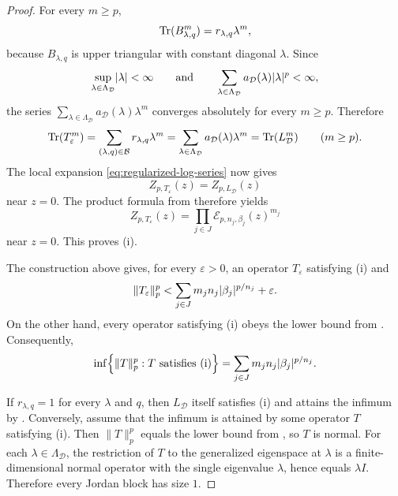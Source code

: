 \begin{proof}
  For every \(m\ge p\),
  \[
    \operatorname{Tr}(B_{\lambda,q}^m)=r_{\lambda,q}\lambda^m,
  \]
  because \(B_{\lambda,q}\) is upper triangular with constant diagonal
  \(\lambda\). Since
  \[
    \sup_{\lambda\in\Lambda_{\mathcal D}}\lvert \lambda \rvert<\infty
    \qquad\text{and}\qquad
    \sum_{\lambda\in\Lambda_{\mathcal D}}
      a_{\mathcal D}(\lambda)\lvert \lambda \rvert^p<\infty,
  \]
  the series
  \(
    \sum_{\lambda\in\Lambda_{\mathcal D}}a_{\mathcal D}(\lambda)\lambda^m
  \)
  converges absolutely for every \(m\ge p\). Therefore
  \[
    \operatorname{Tr}(T_\varepsilon^m)
    =\sum_{(\lambda,q)\in\mathcal B}r_{\lambda,q}\lambda^m
    =\sum_{\lambda\in\Lambda_{\mathcal D}}
      a_{\mathcal D}(\lambda)\lambda^m
    =\operatorname{Tr}(L_{\mathcal D}^m)
    \qquad (m\ge p).
  \]
  The local expansion \eqref{eq:regularized-log-series} now gives
  \[
    Z_{p,T_\varepsilon}(z)
    =Z_{p,L_{\mathcal D}}(z)
  \]
  near \(z=0\). The product formula from
   therefore yields
  \[
    Z_{p,T_\varepsilon}(z)
    =\prod_{j\in J}\mathcal E_{p,n_j,\beta_j}(z)^{m_j}
  \]
  near \(z=0\). This proves \textup{(i)}.

  The construction above gives, for every \(\varepsilon>0\), an operator
  \(T_\varepsilon\) satisfying \textup{(i)} and
  \[
    \|T_\varepsilon\|_p^p
    <\sum_{j\in J}m_jn_j\lvert \beta_j \rvert^{p/n_j}+\varepsilon.
  \]
  On the other hand, every operator satisfying \textup{(i)} obeys the
  lower bound from . Consequently,
  \[
    \inf\Bigl\{\|T\|_p^p:T\text{ satisfies \textup{(i)}}\Bigr\}
    =\sum_{j\in J}m_jn_j\lvert \beta_j \rvert^{p/n_j}.
  \]

  If \(r_{\lambda,q}=1\) for every \(\lambda\) and \(q\), then
  \(L_{\mathcal D}\) itself satisfies \textup{(i)} and attains the
  infimum by . Conversely, assume that
  the infimum is attained by some operator \(T\) satisfying
  \textup{(i)}. Then \(\|T\|_p^p\) equals the lower bound from
  , so \(T\) is normal. For each
  \(\lambda\in \Lambda_{\mathcal D}\), the restriction of \(T\) to the
  generalized eigenspace at \(\lambda\) is a finite-dimensional normal
  operator with the single eigenvalue \(\lambda\), hence equals
  \(\lambda I\). Therefore every Jordan block has size \(1\).
\end{proof}
